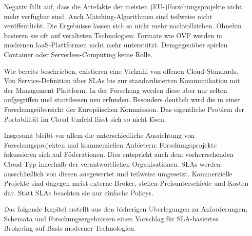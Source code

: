 Negativ fällt auf, dass die Artefakte der meisten (EU-)Forschungsprojekte
nicht mehr verfügbar sind. Auch Matching-Algorithmen sind teilweise nicht veröffentlicht. Die Ergebnisse lassen sich so nicht mehr nachvollziehen. Ohnehin basieren sie oft auf veralteten Technologien: Formate wie OVF werden in modernen IaaS-Plattformen nicht mehr unterstützt. Demgegenüber spielen Container oder Serverless-Computing keine Rolle.

Wie bereits beschrieben, existieren eine Vielzahl von offenen Cloud-Standards. Von Service-Definition über SLAs bis zur standardisierten Kommunikation mit der Management Plattform. In der Forschung werden diese aber nur selten aufgegriffen und stattdessen neu erfunden. Besonders deutlich wird die in einer Forschungsübersicht der Europäischen Kommission.
Das eigentliche Problem der Portabilität im Cloud-Umfeld lässt sich so nicht lösen.

Insgesamt bleibt vor allem die unterschiedliche Ausrichtung von Forschungsprojekten und kommerziellen Anbietern: Forschungsprojekte fokussieren sich auf Föderationen. Dies entspricht auch dem vorherrschenden Cloud-Typ innerhalb der verantwortlichen Organisationen. SLAs werden ausschließlich von diesen ausgewertet und teilweise umgesetzt. Kommerzielle Projekte sind dagegen meist externe Broker, stellen Preisunterschiede und Kosten dar. Statt SLAs beachten sie nur einfache Policys.

Das folgende Kapitel erstellt aus den bisherigen Überlegungen zu Anforderungen, Schemata und Forschungsergebnissen einen Vorschlag für SLA-basiertes Brokering auf Basis moderner Technologien.
